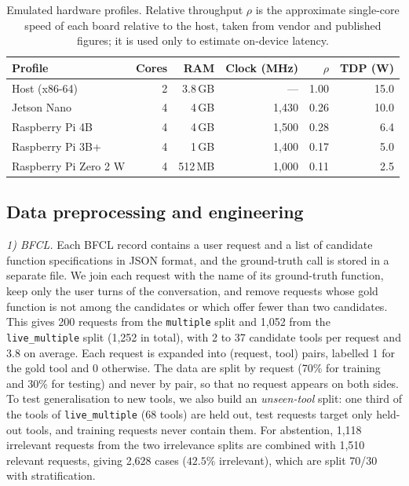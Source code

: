 \documentclass[journal]{IEEEtran}
\begin{document}
\begin{table}[t]
\centering
\caption{Emulated hardware profiles. Relative throughput $\rho$ is the
approximate single-core speed of each board relative to the host, taken from
vendor and published figures; it is used only to estimate on-device latency.}
\label{tab:boards}
\footnotesize
\setlength{\tabcolsep}{4pt}
\begin{tabular}{@{}lrrrrr@{}}
\toprule
Profile & Cores & RAM & Clock (MHz) & $\rho$ & TDP (W) \\
\midrule
Host (x86-64)          & 2 & 3.8\,GB & --- & 1.00 & 15.0 \\
Jetson Nano            & 4 & 4\,GB & 1{,}430 & 0.26 & 10.0 \\
Raspberry Pi 4B        & 4 & 4\,GB & 1{,}500 & 0.28 & 6.4 \\
Raspberry Pi 3B+       & 4 & 1\,GB & 1{,}400 & 0.17 & 5.0 \\
Raspberry Pi Zero 2 W  & 4 & 512\,MB & 1{,}000 & 0.11 & 2.5 \\
\bottomrule
\end{tabular}
\end{table}

\subsection{Data preprocessing and engineering}\label{sec:prep}
\textit{1) BFCL.} Each BFCL record contains a user request and a list of
candidate function specifications in JSON format, and the ground-truth call is
stored in a separate file. We join each request with the name of its
ground-truth function, keep only the user turns of the conversation, and remove
requests whose gold function is not among the candidates or which offer fewer
than two candidates. This gives 200 requests from the \texttt{multiple} split
and 1{,}052 from the \texttt{live\_multiple} split (1{,}252 in total), with 2 to
37 candidate tools per request and 3.8 on average. Each request is expanded into
(request, tool) pairs, labelled 1 for the gold tool and 0 otherwise. The data
are split by request (70\% for training and 30\% for testing) and never by
pair, so that no request appears on both sides. To test generalisation to new
tools, we also build an \emph{unseen-tool} split: one third of the tools of
\texttt{live\_multiple} (68 tools) are held out, test requests target only
held-out tools, and training requests never contain them. For abstention,
1{,}118 irrelevant requests from the two irrelevance splits are combined with
1{,}510 relevant requests, giving 2{,}628 cases ($42.5\%$ irrelevant), which are
split 70/30 with stratification.
\end{document}
